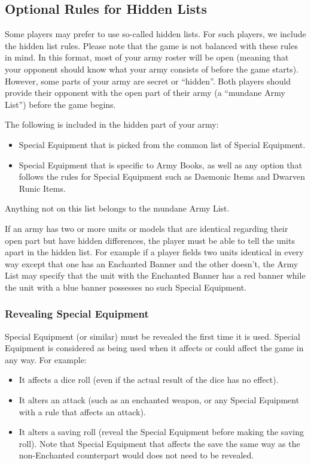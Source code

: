 \begin{optionalrules}
\subsection{Optional Rules for Hidden Lists}
\label{optional_rules_for_hidden_lists}

Some players may prefer to use so-called hidden lists. For such players, we include the hidden list rules. Please note that the game is not balanced with these rules in mind. In this format, most of your army roster will be open (meaning that your opponent should know what your army consists of before the game starts). However, some parts of your army are secret or \enquote{hidden}. Both players should provide their opponent with the open part of their army (a \enquote{mundane Army List}) before the game begins.

The following is included in the hidden part of your army:

\begin{itemize}[label={-}]
\item Special Equipment that is picked from the common list of Special Equipment.
\item Special Equipment that is specific to Army Books, as well as any option that follows the rules for Special Equipment such as Daemonic Items and Dwarven Runic Items.
\end{itemize}

Anything not on this list belongs to the mundane Army List.

If an army has two or more units or models that are identical regarding their open part but have hidden differences, the player must be able to tell the units apart in the hidden list. For example if a player fields two units identical in every way except that one has an Enchanted Banner and the other doesn't, the Army List may specify that the unit with the Enchanted Banner has a red banner while the unit with a blue banner possesses no such Special Equipment.

\subsubsection{Revealing Special Equipment}

Special Equipment (or similar) must be revealed the first time it is used. Special Equipment is considered as being used when it affects or could affect the game in any way. For example:
\begin{itemize}[label={-}]
\item It affects a dice roll (even if the actual result of the dice has no effect).
\item It alters an attack (such as an enchanted weapon, or any Special Equipment with a rule that affects an attack).
\item It alters a saving roll (reveal the Special Equipment before making the saving roll). Note that Special Equipment that affects the save the same way as the non-Enchanted counterpart would does not need to be revealed.
\end{itemize}


\end{optionalrules}
